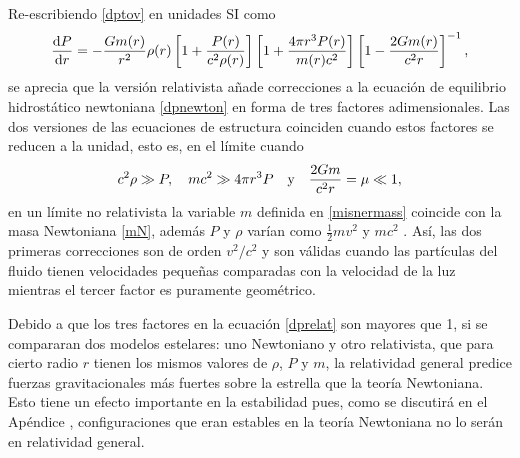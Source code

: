 Re-escribiendo \eqref{dptov} en unidades SI como
\begin{equation}
    \dv{P}{r} =  - \frac { G  m ( r ) } { r ^ { 2 } } \rho ( r ) \left[ 1 + \frac { P ( r ) } {c ^ { 2 } \rho ( r ) } \right] \left[ 1 + \frac { 4 \pi r ^ { 3 } P ( r ) } { m ( r ) c ^ { 2 } } \right]  \left[ 1 - \frac { 2 G m ( r ) } { c ^ { 2 } r } \right] ^ { - 1 }, 
    \label{dprelat}
\end{equation}
se aprecia que la versión relativista añade correcciones a la ecuación de equilibrio hidrostático newtoniana \eqref{dpnewton} en forma de tres factores adimensionales. Las dos versiones de las ecuaciones de estructura coinciden cuando estos factores se reducen a la unidad, esto es, en el límite cuando 
\begin{equation}
    c^2\rho \gg P \qc mc^2 \gg 4\pi r^3P \quad \text{y} \quad  \frac{2Gm}{c^2r}= \mu \ll 1,
\end{equation}
en un límite no relativista la variable $m$ definida en \eqref{misnermass} coincide con la masa Newtoniana \eqref{mN}, además $P$ y $\rho$ varían como $\frac{1}{2}mv^2$ y  $mc^2$ \cite{Silbar2003}. Así, las dos primeras correcciones son de orden $v^2/c^2$ y son válidas cuando las partículas del fluido tienen velocidades pequeñas comparadas con la velocidad de la luz mientras el tercer factor es puramente geométrico. 

Debido a que los tres factores en la ecuación \eqref{dprelat} son mayores que 1, si se compararan dos modelos estelares: uno Newtoniano y otro relativista, que para cierto radio $r$ tienen los mismos valores de $\rho$, $P$ y $m$, la relatividad general predice fuerzas gravitacionales más fuertes sobre la estrella que la teoría Newtoniana. Esto tiene un efecto importante en la estabilidad pues, como se discutirá en el Apéndice , configuraciones que eran estables en la teoría Newtoniana no lo serán en relatividad general. 

